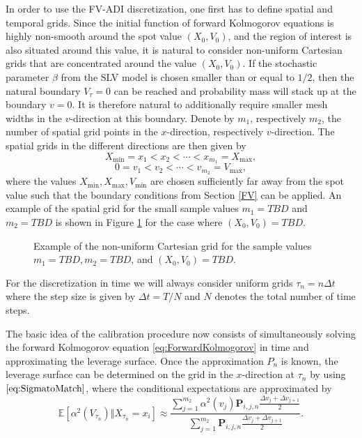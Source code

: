 \documentclass[10pt]{article}
\begin{document}
In order to use the FV-ADI discretization, one first has to define spatial and temporal grids. Since the initial function of forward Kolmogorov equations is highly non-smooth around the spot value $(X_{0},V_{0})$, and the region of interest is also situated around this value, it is natural to consider non-uniform Cartesian grids that are concentrated around the value $(X_{0},V_{0})$. If the stochastic parameter $\beta$ from the SLV model is chosen smaller than or equal to $1/2$, then the natural boundary $V_{\tau}=0$ can be reached and probability mass will stack up at the boundary $v=0$. It is therefore natural to additionally require smaller mesh widths in the $v$-direction at this boundary. Denote by $m_{1}$, respectively $m_{2}$, the number of spatial grid points in the $x$-direction, respectively $v$-direction. The spatial grids in the different directions are then given by
$$ X_{\min} = x_{1} < x_{2} < \cdots < x_{m_{1}} = X_{\max}, $$
$$ 0 = v_{1} < v_{2} < \cdots < v_{m_{2}} = V_{\max}, $$ 
where the values $X_{\min}, X_{\max}, V_{\min}$ are chosen sufficiently far away from the spot value such that the boundary conditions from Section \ref{FV} can be applied. An example of the spatial grid for the small sample values $m_{1} = TBD$ and $m_{2}= TBD$ is shown in Figure \ref{fig:Grid2D} for the case where $(X_{0},V_{0}) = TBD$.
\begin{figure}
\begin{center}
\caption{Example of the non-uniform Cartesian grid for the sample values $m_{1}=TBD, m_{2} = TBD$, and $(X_{0},V_{0}) = TBD$.}
\label{fig:Grid2D}
\end{center}
\end{figure}
For the discretization in time we will always consider uniform grids $\tau_{n} = n \Delta t$ where the step size is given by $\Delta t = T / N$ and $N$ denotes the total number of time steps.

The basic idea of the calibration procedure now consists of simultaneously solving the forward Kolmogorov equation \eqref{eq:ForwardKolmogorov} in time and approximating the leverage surface. Once the approximation $P_{n}$ is known, the leverage surface can be determined on the grid in the $x$-direction at $\tau_{n}$ by using $\eqref{eq:SigmatoMatch}$, where the conditional expectations are approximated by
$$ \mathbb{E}[ \alpha^{2}(V_{\tau_{n}}) \Vert X_{\tau_{n}} = x_{i} ] \approx \frac{\sum_{j=1}^{m_{2}} \alpha^{2}(v_{j}) \boldsymbol{P}_{i,j,n} \tfrac{\Delta v_{j} + \Delta v_{j+1}}{2}}{\sum_{j=1}^{m_{2}} \boldsymbol{P}_{i,j,n} \tfrac{\Delta v_{j} + \Delta v_{j+1}}{2}}. $$ 
\end{document}
